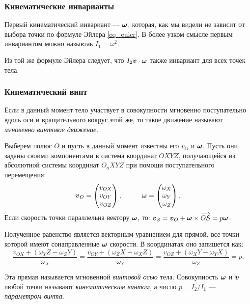 \subsubsection*{Кинематические инварианты}
\begin{to_def}
	Первый кинематический инвариант --- $\mbox{\boldmath $\omega$}$, которая, как мы видели не зависит от выбора точки по формуле Эйлера \eqref{eq_euler}.	
	В более узком смысле первым инвариантом можно назывтаь $I_1 = \omega^2 $.
\end{to_def}
\begin{to_def}
	Из той же формуле Эйлера следует, что $I_2 \mbox{\boldmath $v$} \cdot \mbox{\boldmath $\omega$}$ также инвариант для всех точек тела.
\end{to_def}

\subsubsection*{Кинематический винт}
\begin{to_def}
	Если в данный момент тело участвует в совокупности мгновенно поступательно вдоль оси и вращательного вокруг этой же, то такое движение называют \textit{мгновенно винтовое движение}.
\end{to_def}
Выберем полюс $O$ и пусть в данный момент известны его $v_O$ и $\mbox{\boldmath $\omega$}$. Пусть они заданы своими компонентами в система координат $O X Y Z$, получающейся из абсолютной системы координат $O_a X Y Z$ при помощи поступательного перемещения:
\begin{equation*}
	\mbox{\boldmath $v$}_O = \begin{pmatrix}
		v_{O X} \\ v_{O Y} \\ v_{O Z}
	\end{pmatrix},
	\hspace*{1 cm}
	\mbox{\boldmath $\omega$} = \begin{pmatrix}
		\omega_X \\ \omega_Y \\ \omega_Z
	\end{pmatrix}.
\end{equation*}
Если скорость точки параллельна вектору $\mbox{\boldmath $\omega$}$, то: $\mbox{\boldmath $v$}_S = \mbox{\boldmath $v$}_O + \mbox{\boldmath $\omega$} \times \overrightarrow{O S} = p \mbox{\boldmath $\omega$}$.

Полученное равенство является векторным уравнением для прямой, все точки которой имеют сонаправленные $\mbox{\boldmath $\omega$}$ скорости. В координатах оно запишется как:
\begin{equation*}
	\frac{v_{O X} + (\omega_Y Z - \omega_Z Y)}{\omega_X} = \frac{v_{O Y} + (\omega_Z X - \omega_X Z)}{\omega_Y} = \frac{v_{O Z} + (\omega_X Y - \omega_Y X)}{\omega_Z} = p.
\end{equation*}
\begin{to_def}
	Эта прямая называется мгновенной \textit{винтовой осью} тела. Совокупность $\mbox{\boldmath $\omega$}$ и $\mbox{\boldmath $v$}$ любой точки называют \textit{кинематическим винтом}, а число $p = I_2/I_1$ --- \textit{параметром винта}.	
\end{to_def}


